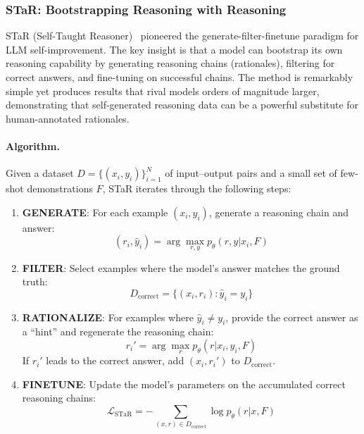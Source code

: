 \subsubsection{STaR: Bootstrapping Reasoning with Reasoning}
\label{sec:star}

STaR (Self-Taught Reasoner)~\citep{zelikman2022star} pioneered the generate-filter-finetune paradigm for LLM self-improvement. The key insight is that a model can bootstrap its own reasoning capability by generating reasoning chains (rationales), filtering for correct answers, and fine-tuning on successful chains. The method is remarkably simple yet produces results that rival models orders of magnitude larger, demonstrating that self-generated reasoning data can be a powerful substitute for human-annotated rationales.

\paragraph{Algorithm.}
Given a dataset $D = \{(x_i, y_i)\}_{i=1}^{N}$ of input--output pairs and a small set of few-shot demonstrations $F$, STaR iterates through the following steps:

\begin{enumerate}
    \item \textbf{GENERATE}: For each example $(x_i, y_i)$, generate a reasoning chain and answer:
    \begin{equation}
        (r_i, \hat{y}_i) = \arg\max_{r, y} p_\theta(r, y | x_i, F)
        \label{eq:star-generate}
    \end{equation}
    \item \textbf{FILTER}: Select examples where the model's answer matches the ground truth:
    \begin{equation}
        D_{\text{correct}} = \{(x_i, r_i) : \hat{y}_i = y_i\}
        \label{eq:star-filter}
    \end{equation}
    \item \textbf{RATIONALIZE}: For examples where $\hat{y}_i \neq y_i$, provide the correct answer as a ``hint'' and regenerate the reasoning chain:
    \begin{equation}
        r_i' = \arg\max_{r} p_\theta(r | x_i, y_i, F)
        \label{eq:star-rationalize}
    \end{equation}
    If $r_i'$ leads to the correct answer, add $(x_i, r_i')$ to $D_{\text{correct}}$.
    \item \textbf{FINETUNE}: Update the model's parameters on the accumulated correct reasoning chains:
    \begin{equation}
        \mathcal{L}_{\text{STaR}} = -\sum_{(x, r) \in D_{\text{correct}}} \log p_\theta(r | x, F)
        \label{eq:star-objective}
    \end{equation}
\end{enumerate}

